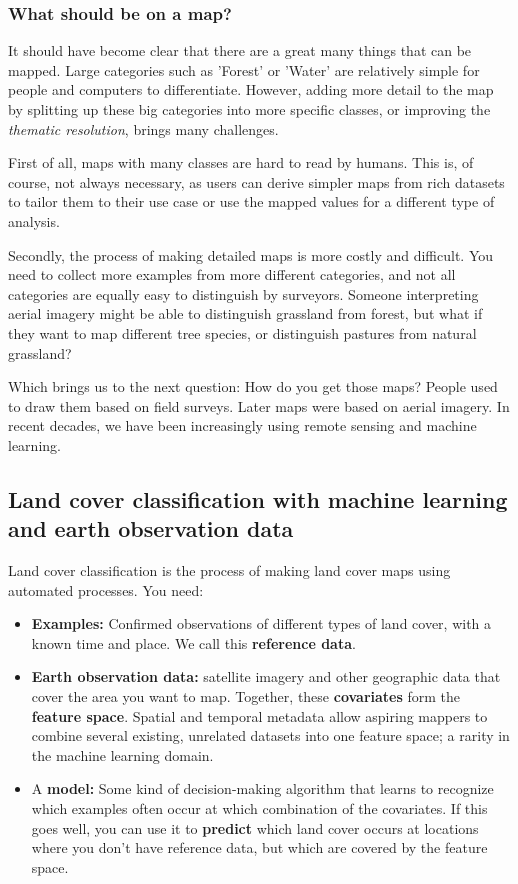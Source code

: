     \subsubsection*{What should be on a map?}

        It should have become clear that there are a great many things that can be mapped. Large categories such as 'Forest' or 'Water' are relatively simple for people and computers to differentiate. However, adding more detail to the map by splitting up these big categories into more specific classes, or improving the \textit{thematic resolution}, brings many challenges. 
        
        First of all, maps with many classes are hard to read by humans. This is, of course, not always necessary, as users can derive simpler maps from rich datasets to tailor them to their use case \citep{tsendbazar2017integrating} or use the mapped values for a different type of analysis. 

        Secondly, the process of making detailed maps is more costly and difficult. You need to collect more examples from more different categories, and not all categories are equally easy to distinguish by surveyors. Someone interpreting aerial imagery might be able to distinguish grassland from forest, but what if they want to map different tree species, or distinguish pastures from natural grassland?

    Which brings us to the next question: How do you get those maps? People used to draw them based on field surveys. Later maps were based on aerial imagery. In recent decades, we have been increasingly using remote sensing and machine learning.

\subsection*{Land cover classification with machine learning and earth observation data}
    
    Land cover classification is the process of making land cover maps using automated processes. You need:
    
    \begin{itemize}
        \item \textbf{Examples:} Confirmed observations of different types of land cover, with a known time and place. We call this \textbf{reference data}.
        \item \textbf{Earth observation data:} satellite imagery and other geographic data that cover the area you want to map. Together, these \textbf{covariates} form the \textbf{feature space}. Spatial and temporal metadata allow aspiring mappers to combine several existing, unrelated datasets into one feature space; a rarity in the machine learning domain. 
        \item A \textbf{model:} Some kind of decision-making algorithm that learns to recognize which examples often occur at which combination of the covariates. If this goes well, you can use it to \textbf{predict} which land cover occurs at locations where you don't have reference data, but which are covered by the feature space.
    \end{itemize}
    
